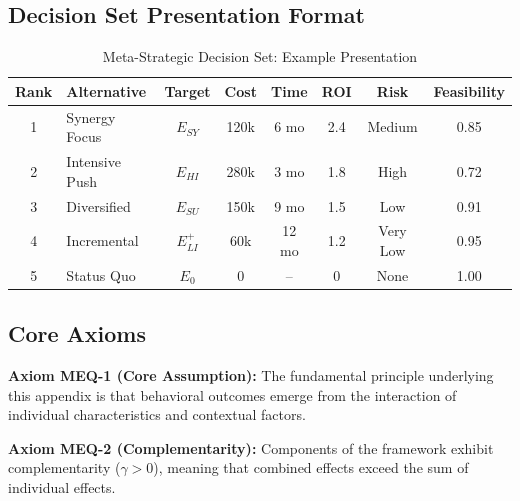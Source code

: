 \subsection{Decision Set Presentation Format}

\begin{table}[H]
\centering
\caption{Meta-Strategic Decision Set: Example Presentation}
\label{tab:meq-decision-example}
\renewcommand{\arraystretch}{1.3}
\small
\begin{tabular}{@{}clcccccc@{}}
\toprule
\textbf{Rank} & \textbf{Alternative} & \textbf{Target} & \textbf{Cost} & \textbf{Time} & \textbf{ROI} & \textbf{Risk} & \textbf{Feasibility} \\
\midrule
1 & Synergy Focus & $E_{SY}$ & 120k & 6 mo & 2.4 & Medium & 0.85 \\
2 & Intensive Push & $E_{HI}$ & 280k & 3 mo & 1.8 & High & 0.72 \\
3 & Diversified & $E_{SU}$ & 150k & 9 mo & 1.5 & Low & 0.91 \\
4 & Incremental & $E_{LI}^+$ & 60k & 12 mo & 1.2 & Very Low & 0.95 \\
5 & Status Quo & $E_0$ & 0 & -- & 0 & None & 1.00 \\
\bottomrule
\end{tabular}
\end{table}


\subsection{Core Axioms}
\label{sec:meq-axioms}

\begin{tcolorbox}[colback=yellow!5!white,colframe=yellow!75!black,title=Axiom MEQ-1: Fundamental Principle]
\textbf{Axiom MEQ-1 (Core Assumption):}
The fundamental principle underlying this appendix is that behavioral outcomes
emerge from the interaction of individual characteristics and contextual factors.
\end{tcolorbox}

\begin{tcolorbox}[colback=yellow!5!white,colframe=yellow!75!black,title=Axiom MEQ-2: Complementarity]
\textbf{Axiom MEQ-2 (Complementarity):}
Components of the framework exhibit complementarity ($\gamma > 0$), meaning
that combined effects exceed the sum of individual effects.
\end{tcolorbox}



